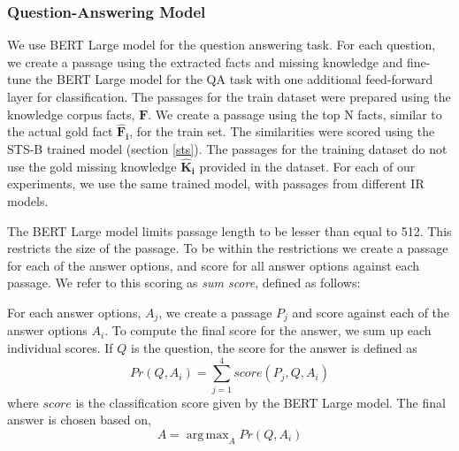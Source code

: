 \documentclass[11pt,a4paper]{article}
\DeclareMathOperator*{\argmax}{arg\,max}
\begin{document}
\subsubsection{Question-Answering Model}
We use BERT Large model for the question answering task. For each question, we create a passage using the extracted facts and missing knowledge and fine-tune the BERT Large model for the QA task with one additional feed-forward layer for classification. The passages for the train dataset were prepared using the knowledge corpus facts, $\mathbf{F}$. We create a passage using  the top N  facts, similar to the actual gold fact $\mathbf{\hat{F}_i}$, for the train set. The similarities were scored using the STS-B trained model (section \ref{sts}). The passages for the training dataset do not use the gold missing knowledge $\mathbf{\hat{K}_i}$ provided in the dataset. For each of our experiments, we use the same trained model, with passages from different IR models.

The BERT Large model limits passage length to be lesser than equal to 512. This restricts the size of the passage. To be within the restrictions we create a passage for each of the answer options, and score for all answer options against each passage. We refer to this scoring as \textit{sum score}, defined as follows:

For each answer options, $A_j$, we create a passage $P_j$ and score against each of the  answer options $A_i$. To compute the final score for the answer, we sum up each individual scores. If $Q$ is the question, the score for the answer is defined as
\begin{equation*}
    Pr(Q,A_i) = \sum_{j=1}^{4}score(P_j,Q,A_i)
\end{equation*}
where $score$ is the classification score given by the BERT Large model.
The final answer is chosen based on, 
\begin{equation*}
A = \argmax_A Pr(Q,A_i)
\end{equation*}
\end{document}
